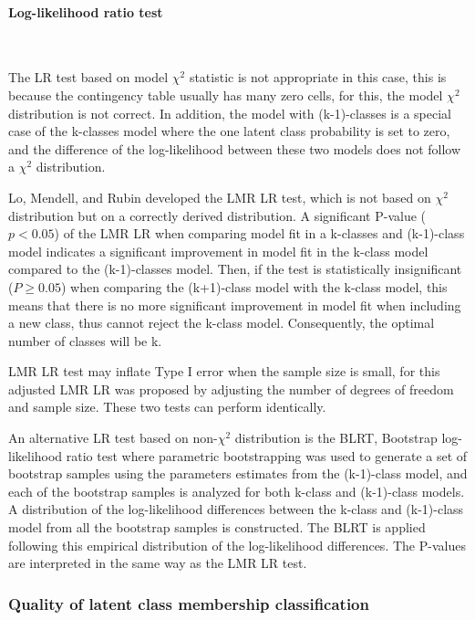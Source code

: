 \documentclass[12pt,a4paper,oneside]{reedthesis}
\begin{document}
\hypertarget{log-likelihood-ratio-test}{%
\paragraph{Log-likelihood ratio test}\label{log-likelihood-ratio-test}}

~

The LR test based on model \(\chi^2\) statistic is not appropriate in this case, this is because the contingency table usually has many zero cells, for this, the model \(\chi^2\) distribution is not correct. In addition, the model with (k-1)-classes is a special case of the k-classes model where the one latent class probability is set to zero, and the difference of the log-likelihood between these two models does not follow a \(\chi^2\) distribution.

Lo, Mendell, and Rubin developed the LMR LR test, which is not based on \(\chi^2\) distribution but on a correctly derived distribution. A significant P-value (\(p<0.05\)) of the LMR LR when comparing model fit in a k-classes and (k-1)-class model indicates a significant improvement in model fit in the k-class model compared to the (k-1)-classes model. Then, if the test is statistically insignificant (\(P\ge 0.05\)) when comparing the (k+1)-class model with the k-class model, this means that there is no more significant improvement in model fit when including a new class, thus cannot reject the k-class model. Consequently, the optimal number of classes will be k.

LMR LR test may inflate Type I error when the sample size is small, for this adjusted LMR LR was proposed by adjusting the number of degrees of freedom and sample size. These two tests can perform identically.

An alternative LR test based on non-\(\chi^2\) distribution is the BLRT, Bootstrap log-likelihood ratio test where parametric bootstrapping was used to generate a set of bootstrap samples using the parameters estimates from the (k-1)-class model, and each of the bootstrap samples is analyzed for both k-class and (k-1)-class models. A distribution of the log-likelihood differences between the k-class and (k-1)-class model from all the bootstrap samples is constructed. The BLRT is applied following this empirical distribution of the log-likelihood differences. The P-values are interpreted in the same way as the LMR LR test.

\hypertarget{quality-of-latent-class-membership-classification}{%
\subsubsection{Quality of latent class membership classification}\label{quality-of-latent-class-membership-classification}}
\end{document}
